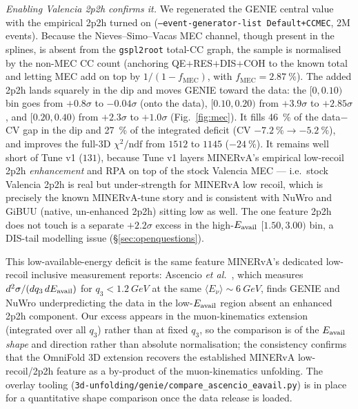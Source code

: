 \emph{Enabling Valencia 2p2h confirms it.} We regenerated the GENIE central
value with the empirical 2p2h turned on (\texttt{--event-generator-list
Default+CCMEC}, 2M events). Because the Nieves--Simo--Vacas MEC channel, though
present in the splines, is absent from the \texttt{gspl2root} total-CC graph, the
sample is normalised by the non-MEC CC count (anchoring QE$+$RES$+$DIS$+$COH to
the known total and letting MEC add on top by $1/(1-f_{\mathrm{MEC}})$, with
$f_{\mathrm{MEC}}=\SI{2.87}{\percent}$). The added 2p2h lands squarely in the dip
and moves GENIE toward the data: the $[0,0.10)$ bin goes from $+0.8\sigma$ to
$-0.04\sigma$ (onto the data), $[0.10,0.20)$ from $+3.9\sigma$ to $+2.85\sigma$,
and $[0.20,0.40)$ from $+2.3\sigma$ to $+1.0\sigma$ (Fig.~\ref{fig:mec}). It
fills \SI{46}{\percent} of the data$-$CV gap in the dip and \SI{27}{\percent} of
the integrated deficit (CV $-\SI{7.2}{\percent}\to-\SI{5.2}{\percent}$), and
improves the full-3D $\chi^{2}/\mathrm{ndf}$ from $1512$ to $1145$
($-\SI{24}{\percent}$). It remains well short of Tune v1 ($131$), because Tune v1
layers MINERvA's empirical low-recoil 2p2h \emph{enhancement} and RPA on top of
the stock Valencia MEC --- i.e.\ stock Valencia 2p2h is real but under-strength
for MINERvA low recoil, which is precisely the known MINERvA-tune story and is
consistent with NuWro and GiBUU (native, un-enhanced 2p2h) sitting low as well.
The one feature 2p2h does not touch is a separate $+2.2\sigma$ excess in the
high-$E_{\mathrm{avail}}$ $[1.50,3.00)$ bin, a DIS-tail modelling issue
(\S\ref{sec:openquestions}).

This low-available-energy deficit is the same feature MINERvA's dedicated low-recoil
inclusive measurement reports: Ascencio \emph{et al.}~\cite{MINERvA:2022incl}, which
measures $d^{2}\sigma/(dq_{3}\,dE_{\mathrm{avail}})$ for $q_{3}<\SI{1.2}{GeV}$ at the same
$\langle E_\nu\rangle\sim\SI{6}{GeV}$, finds GENIE and NuWro underpredicting the data in
the low-$E_{\mathrm{avail}}$ region absent an enhanced 2p2h component. Our excess appears in the
muon-kinematics extension (integrated over all $q_3$) rather than at fixed $q_3$, so the
comparison is of the $E_{\mathrm{avail}}$ \emph{shape} and direction rather than absolute
normalisation; the consistency confirms that the OmniFold 3D extension recovers the
established MINERvA low-recoil/2p2h feature as a by-product of the muon-kinematics
unfolding. The overlay tooling
(\texttt{3d-unfolding/genie/compare\_ascencio\_eavail.py}) is in place for a quantitative
shape comparison once the \cite{MINERvA:2022incl} data release is loaded.

